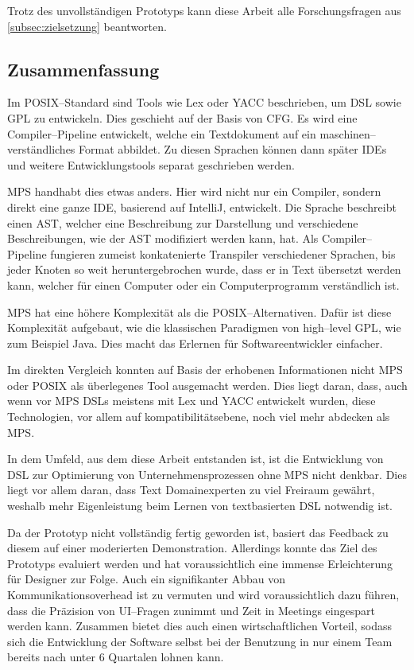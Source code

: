 Trotz des unvollständigen Prototyps kann diese Arbeit alle Forschungsfragen aus \autoref{subsec:zielsetzung} beantworten.

\subsection{Zusammenfassung}\label{subsec:zusammenfassung}
Im \acs{POSIX}--Standard sind Tools wie Lex oder \ac{YACC} beschrieben, um \ac{DSL} sowie \ac{GPL} zu entwickeln.
Dies geschieht auf der Basis von \ac{CFG}.
Es wird eine Compiler--Pipeline entwickelt, welche ein Textdokument auf ein maschinen--verständliches Format abbildet.
Zu diesen Sprachen können dann später \acp{IDE} und weitere Entwicklungstools separat geschrieben werden.

\ac{MPS} handhabt dies etwas anders.
Hier wird nicht nur ein Compiler, sondern direkt eine ganze \ac{IDE}, basierend auf IntelliJ, entwickelt.
Die Sprache beschreibt einen \ac{AST}, welcher eine Beschreibung zur Darstellung und verschiedene Beschreibungen, wie der \ac{AST} modifiziert werden kann, hat.
Als Compiler--Pipeline fungieren zumeist konkatenierte Transpiler verschiedener Sprachen, bis jeder Knoten so weit heruntergebrochen wurde, dass er in Text übersetzt werden kann, welcher für einen Computer oder ein Computerprogramm verständlich ist.

\ac{MPS} hat eine höhere Komplexität als die \acs{POSIX}--Alternativen.
Dafür ist diese Komplexität aufgebaut, wie die klassischen Paradigmen von high--level \ac{GPL}, wie zum Beispiel Java.
Dies macht das Erlernen für Softwareentwickler einfacher.

Im direkten Vergleich konnten auf Basis der erhobenen Informationen nicht \ac{MPS} oder \ac{POSIX} als überlegenes Tool ausgemacht werden.
Dies liegt daran, dass, auch wenn vor \ac{MPS} \acp{DSL} meistens mit Lex und \ac{YACC} entwickelt wurden, diese Technologien, vor allem auf kompatibilitätsebene, noch viel mehr abdecken als \ac{MPS}.

In dem Umfeld, aus dem diese Arbeit entstanden ist, ist die Entwicklung von \ac{DSL} zur Optimierung von Unternehmensprozessen ohne \ac{MPS} nicht denkbar.
Dies liegt vor allem daran, dass Text Domainexperten zu viel Freiraum gewährt, weshalb mehr Eigenleistung beim Lernen von textbasierten \ac{DSL} notwendig ist.

Da der Prototyp nicht vollständig fertig geworden ist, basiert das Feedback zu diesem auf einer moderierten Demonstration.
Allerdings konnte das Ziel des Prototyps evaluiert werden und hat voraussichtlich eine immense Erleichterung für Designer zur Folge.
Auch ein signifikanter Abbau von Kommunikationsoverhead ist zu vermuten und wird voraussichtlich dazu führen, dass die Präzision von \acs{UI}--Fragen zunimmt und Zeit in Meetings eingespart werden kann.
Zusammen bietet dies auch einen wirtschaftlichen Vorteil, sodass sich die Entwicklung der Software selbst bei der Benutzung in nur einem Team bereits nach unter 6 Quartalen lohnen kann.

